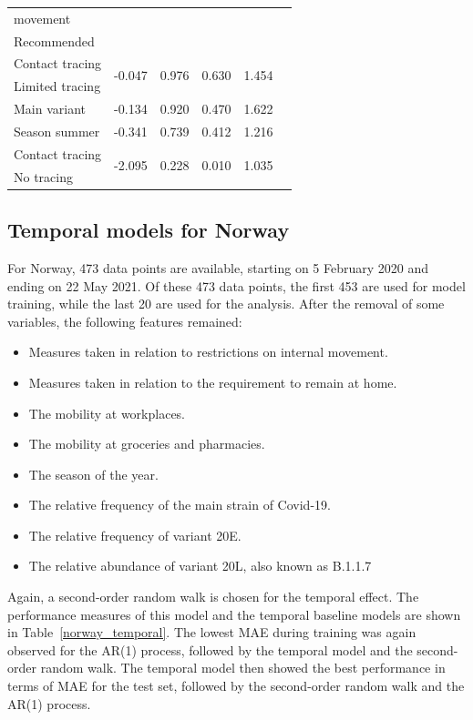 \begin{table}[H]
\begin{tabular}{l r r r r c}
movement \\
Recommended \\
Contact tracing & \multirow{2}{*}{-0.047} & \multirow{2}{*}{0.976} & \multirow{2}{*}{0.630} & \multirow{2}{*}{1.454} \\
Limited tracing \\
Main variant & -0.134 & 0.920 & 0.470 & 1.622 \\
Season summer & -0.341 & 0.739 & 0.412 & 1.216 \\
Contact tracing & \multirow{2}{*}{-2.095} & \multirow{2}{*}{0.228} & \multirow{2}{*}{0.010} & \multirow{2}{*}{1.035} \\
No tracing \\
\bottomrule
\end{tabular}
\end{table}
\subsection{Temporal models for Norway}
For Norway, 473 data points are available, starting on 5 February 2020 and ending on 22 May 2021. Of these 473 data points, the first 453 are used for model training, while the last 20 are used for the analysis. After the removal of some variables, the following features remained:
\begin{itemize}
    \item Measures taken in relation to restrictions on internal movement.
    \item Measures taken in relation to the requirement to remain at home.
    \item The mobility at workplaces.
    \item The mobility at groceries and pharmacies.
    \item The season of the year.
    \item The relative frequency of the main strain of Covid-19.
    \item The relative frequency of variant 20E.
    \item The relative abundance of variant 20L, also known as B.1.1.7
\end{itemize}
Again, a second-order random walk is chosen for the temporal effect. The performance measures of this model and the temporal baseline models are shown in Table~\ref{norway_temporal}. The lowest MAE during training was again observed for the AR(1) process, followed by the temporal model and the second-order random walk. The temporal model then showed the best performance in terms of MAE for the test set, followed by the second-order random walk and the AR(1) process.
